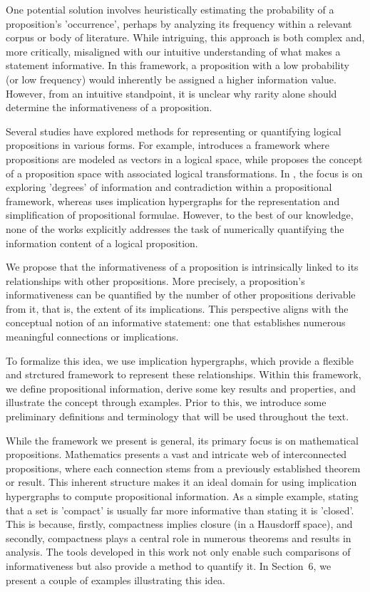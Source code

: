 \documentclass[11pt]{article}
\theoremstyle{definition}
\theoremstyle{plain}
\theoremstyle{remark}
\begin{document}
One potential solution involves heuristically estimating the probability of a proposition's 'occurrence', perhaps by analyzing its frequency within a relevant corpus or body of literature. While intriguing, this approach is both complex and, more critically, misaligned with our intuitive understanding of what makes a statement informative. In this framework, a proposition with a low probability (or low frequency) would inherently be assigned a higher information value. However, from an intuitive standpoint, it is unclear why rarity alone should determine the informativeness of a proposition.

Several studies have explored methods for representing or quantifying logical propositions in various forms. For example, \cite{logicasvector} introduces a framework where propositions are modeled as vectors in a logical space, while \cite{propspace} proposes the concept of a proposition space with associated logical transformations. In \cite{inproceedings}, the focus is on exploring 'degrees' of information and contradiction within a propositional framework, whereas \cite{propformulae} uses implication hypergraphs for the representation and simplification of propositional formulae. However, to the best of our knowledge, none of the works explicitly addresses the task of numerically quantifying the information content of a logical proposition.

We propose that the informativeness of a proposition is intrinsically linked to its relationships with other propositions. More precisely, a proposition's informativeness can be quantified by the number of other propositions derivable from it, that is, the extent of its implications. This perspective aligns with the conceptual notion of an informative statement: one that establishes numerous meaningful connections or implications.

To formalize this idea, we use implication hypergraphs, which provide a flexible and strctured framework to represent these relationships. Within this framework, we define propositional information, derive some key results and properties, and illustrate the concept through examples. Prior to this, we introduce some preliminary definitions and terminology that will be used throughout the text.

While the framework we present is general, its primary focus is on mathematical propositions. Mathematics presents a vast and intricate web of interconnected propositions, where each connection stems from a previously established theorem or result. This inherent structure makes it an ideal domain for using implication hypergraphs to compute propositional information. As a simple example, stating that a set is 'compact' is usually far more informative than stating it is 'closed'. This is because, firstly, compactness implies closure (in a Hausdorff space), and secondly, compactness plays a central role in numerous theorems and results in analysis. The tools developed in this work not only enable such comparisons of informativeness but also provide a method to quantify it. In Section~6, we present a couple of examples illustrating this idea.
\end{document}
